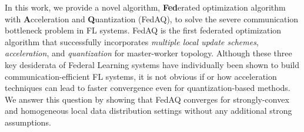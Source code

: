 In this work, we provide a novel algorithm, \textbf{Fed}erated optimization algorithm with \textbf{A}cceleration and \textbf{Q}uantization (FedAQ), to solve the severe communication bottleneck problem in FL systems. FedAQ is the first federated optimization algorithm that successfully incorporates \emph{multiple local update schemes}, \emph{acceleration}, and \emph{quantization} for master-worker topology. Although these three key desiderata of Federal Learning systems have individually been shown to build communication-efficient FL systems, it is not obvious if or how acceleration techniques can lead to faster convergence even for quantization-based methods. We answer this question by showing that FedAQ converges for strongly-convex and homogeneous local data distribution settings without any additional strong assumptions.

